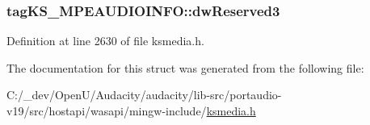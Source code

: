 \subsubsection[{\texorpdfstring{dw\+Reserved3}{dwReserved3}}]{ tag\+K\+S\+\_\+\+M\+P\+E\+A\+U\+D\+I\+O\+I\+N\+F\+O\+::dw\+Reserved3}\hypertarget{structtag_k_s___m_p_e_a_u_d_i_o_i_n_f_o_a73d298bb909e7ebd3917bb28c01a1faf}{}\label{structtag_k_s___m_p_e_a_u_d_i_o_i_n_f_o_a73d298bb909e7ebd3917bb28c01a1faf}


Definition at line 2630 of file ksmedia.\+h.



The documentation for this struct was generated from the following file\+:\begin{DoxyCompactItemize}
\item 
C\+:/\+\_\+dev/\+Open\+U/\+Audacity/audacity/lib-\/src/portaudio-\/v19/src/hostapi/wasapi/mingw-\/include/\hyperlink{ksmedia_8h}{ksmedia.\+h}\end{DoxyCompactItemize}
